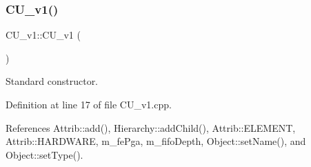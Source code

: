 \subsubsection{\texorpdfstring{C\+U\+\_\+v1()}{CU\_v1()}}
{\footnotesize\ttfamily C\+U\+\_\+v1\+::\+C\+U\+\_\+v1 (\begin{DoxyParamCaption}{ }\end{DoxyParamCaption})}



Standard constructor. 



Definition at line 17 of file C\+U\+\_\+v1.\+cpp.



References Attrib\+::add(), Hierarchy\+::add\+Child(), Attrib\+::\+E\+L\+E\+M\+E\+NT, Attrib\+::\+H\+A\+R\+D\+W\+A\+RE, m\+\_\+fe\+Pga, m\+\_\+fifo\+Depth, Object\+::set\+Name(), and Object\+::set\+Type().


